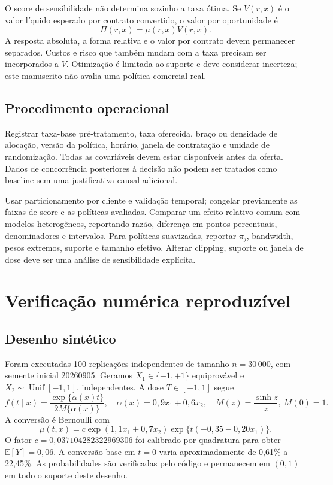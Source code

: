 \documentclass[11pt,a4paper]{article}
\newcommand{\E}{\mathbb E}
\begin{document}
O score de sensibilidade não determina sozinho a taxa ótima. Se $V(r,x)$ é o valor líquido esperado por contrato convertido, o valor por oportunidade é
\[
\Pi(r,x)=\mu(r,x)V(r,x).
\]
A resposta absoluta, a forma relativa e o valor por contrato devem permanecer separados. Custos e risco que também mudam com a taxa precisam ser incorporados a $V$. Otimização é limitada ao suporte e deve considerar incerteza; este manuscrito não avalia uma política comercial real.

\subsection{Procedimento operacional}
Registrar taxa-base pré-tratamento, taxa oferecida, braço ou densidade de alocação, versão da política, horário, janela de contratação e unidade de randomização. Todas as covariáveis devem estar disponíveis antes da oferta. Dados de concorrência posteriores à decisão não podem ser tratados como baseline sem uma justificativa causal adicional.

Usar particionamento por cliente e validação temporal; congelar previamente as faixas de score e as políticas avaliadas. Comparar um efeito relativo comum com modelos heterogêneos, reportando razão, diferença em pontos percentuais, denominadores e intervalos. Para políticas suavizadas, reportar $\pi_j$, bandwidth, pesos extremos, suporte e tamanho efetivo. Alterar clipping, suporte ou janela de dose deve ser uma análise de sensibilidade explícita.

\section{Verificação numérica reproduzível}
\label{sec:simulation}
\subsection{Desenho sintético}
Foram executadas 100 replicações independentes de tamanho $n=30\,000$, com semente inicial 20260905. Geramos $X_1\in\{-1,+1\}$ equiprovável e $X_2\sim\operatorname{Unif}[-1,1]$, independentes. A dose $T\in[-1,1]$ segue
\begin{equation}
f(t\mid x)=\frac{\exp\{\alpha(x)t\}}{2M\{\alpha(x)\}},\quad
\alpha(x)=0{,}9x_1+0{,}6x_2,\quad
M(z)=\frac{\sinh z}{z},\ M(0)=1.
\label{eq:simf}
\end{equation}
A conversão é Bernoulli com
\begin{equation}
\mu(t,x)=c\exp(1{,}1x_1+0{,}7x_2)
\exp\{t(-0{,}35-0{,}20x_1)\}.
\label{eq:simmu}
\end{equation}
O fator $c=0{,}037104282322969306$ foi calibrado por quadratura para obter $\E[Y]=0{,}06$. A conversão-base em $t=0$ varia aproximadamente de 0,61\% a 22,45\%. As probabilidades são verificadas pelo código e permanecem em $(0,1)$ em todo o suporte deste desenho.
\end{document}
